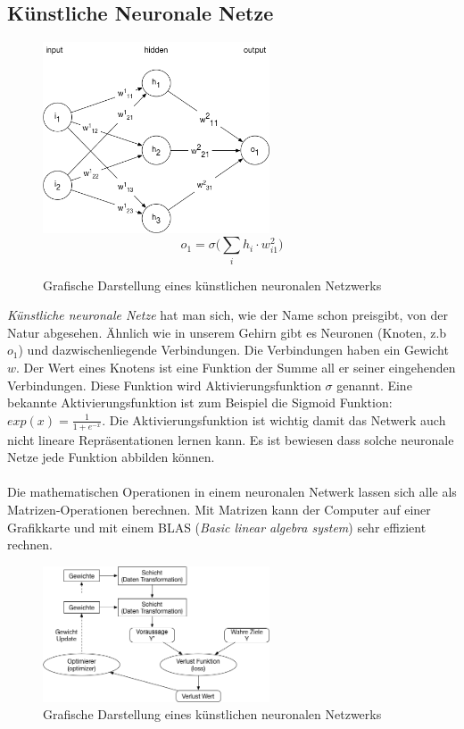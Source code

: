 \subsection{Künstliche Neuronale Netze}
\begin{figure}[hbt]
	\centering
		\includegraphics[width=0.6\textwidth]{assets/neural_net.png}
		$$ o_1 = \sigma\Big(\sum_i h_i \cdot w^{2}_{i1}\Big)$$
	\caption{Grafische Darstellung eines künstlichen neuronalen Netzwerks}
	\label{img:neuralnet}
\end{figure}
\textit{Künstliche neuronale Netze} hat man sich, wie der Name schon preisgibt, von der Natur abgesehen. Ähnlich wie in unserem Gehirn gibt es Neuronen (Knoten, z.b $o_1$) und dazwischenliegende Verbindungen. Die Verbindungen haben ein Gewicht $w$. Der Wert eines Knotens ist eine Funktion der Summe all er seiner eingehenden Verbindungen. Diese Funktion wird Aktivierungsfunktion $\sigma$ genannt. Eine bekannte Aktivierungsfunktion ist zum Beispiel die Sigmoid Funktion: $exp(x) = \frac{1}{1+e^{-x}}$\parencite{neuronale_netze}. 
Die Aktivierungsfunktion ist wichtig damit das Netwerk auch nicht lineare Repräsentationen lernen kann. Es ist bewiesen dass solche neuronale Netze jede Funktion abbilden können\parencite[][Kap. 4]{universal}.
\\ \\ 
Die mathematischen Operationen in einem neuronalen Netwerk lassen sich alle als Matrizen-Operationen berechnen. Mit Matrizen kann der Computer auf einer Grafikkarte und mit einem BLAS (\textit{Basic linear algebra system}) sehr effizient rechnen.

\begin{figure}[hbt]
	\centering
		\includegraphics[width=0.6\textwidth]{assets/anatomy.png}
	\caption{Grafische Darstellung eines künstlichen neuronalen Netzwerks}
	\label{img:anatomy}
\end{figure}

